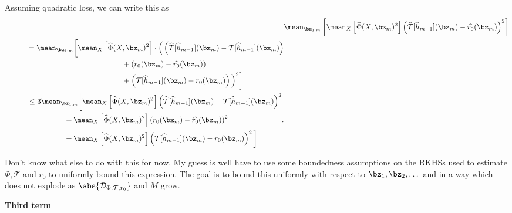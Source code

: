 Assuming quadratic loss, we can write this as
\begin{align*}
    &\mean_{ \bz_{ 1:m } } \left[
        \mean_{ X } \left[
            \hat{ \Phi } ( X, \bz_{ m } )^2
        \right]
        \left(
            \hat{ \mathcal{T} } [ \hat{ h }_{ m-1 } ] ( \bz_{ m } )
            - \hat{ r_{ 0 } } ( \bz_{ m } )
        \right)^2
    \right] \\
    \begin{split}
        &\hspace{1cm}
        = \mean_{ \bz_{ 1:m } } \bigg[
            \mean_{ X } \left[
                \hat{ \Phi } ( X, \bz_{ m } )^2
            \right]
            \cdot \Big(
                \left(
                    \hat{ \mathcal{T} } [ \hat{ h }_{ m-1 } ] ( \bz_{ m } )
                    - \mathcal{T} [ \hat{ h }_{ m-1 } ] ( \bz_{ m } )
                \right) \\
                &\hspace{5.5cm}
                + \left(
                    r_{ 0 } ( \bz_{ m } )
                    - \hat{ r_{ 0 } } ( \bz_{ m } )
                \right) \\
                &\hspace{5.5cm}
                + \left(
                    \mathcal{T} [ \hat{ h }_{ m-1 } ] ( \bz_{ m } )
                    - r_{ 0 } ( \bz_{ m } )
                \right)
            \Big)^2
        \bigg]
    \end{split} \\
    \begin{split}
        &\hspace{1cm}
        \leq 3 \mean_{ \bz_{ 1:m } } \bigg[
            \mean_{ X } \left[
                \hat{ \Phi } ( X, \bz_{ m } )^2
            \right]
            \left(
                \hat{ \mathcal{T} } [ \hat{ h }_{ m-1 } ] ( \bz_{ m } )
                - \mathcal{T} [ \hat{ h }_{ m-1 } ] ( \bz_{ m } )
            \right)^2
            \\
            &\hspace{2.75cm}
            + \mean_{ X } \left[
                \hat{ \Phi } ( X, \bz_{ m } )^2
            \right]
            \left(
                r_{ 0 } ( \bz_{ m } )
                - \hat{ r_{ 0 } } ( \bz_{ m } )
            \right)^2
            \\
            &\hspace{2.75cm}
            + \mean_{ X } \left[
                \hat{ \Phi } ( X, \bz_{ m } )^2
            \right]
            \left(
                \mathcal{T} [ \hat{ h }_{ m-1 } ] ( \bz_{ m } )
                - r_{ 0 } ( \bz_{ m } )
            \right)^2
        \bigg]
    \end{split}
.\end{align*}

{\color{red} Don't know what else to do with this for now.
My guess is well have to use some boundedness assumptions on the RKHSs used to estimate $ \Phi, \mathcal{T} $ and $ r_{ 0 } $ to uniformly bound this expression.
The goal is to bound this uniformly with respect to $ \bz_{ 1 }, \bz_{ 2 }, \dots $ and in a way which does not explode as $ \abs{ \dataoff } $ and $ M $ grow.}


\textbf{Third term }
